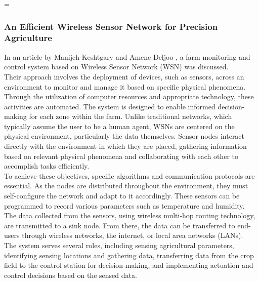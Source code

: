 =\documentclass[12pt, a4paper]{article}
\begin{document}
\subsubsection{An Efficient Wireless Sensor Network for Precision Agriculture}
In an article by Manijeh Keshtgary and Amene Deljoo \cite{keshtgary2012efficient}, a farm monitoring and control system based on Wireless Sensor Network (WSN) was discussed.\\
Their approach involves the deployment of devices, such as sensors, across an environment to monitor and manage it based on specific physical phenomena. Through the utilization of computer resources and appropriate technology, these activities are automated. The system is designed to enable informed decision-making for each zone within the farm. Unlike traditional networks, which typically assume the user to be a human agent, WSNs are centered on the physical environment, particularly the data themselves. Sensor nodes interact directly with the environment in which they are placed, gathering information based on relevant physical phenomena and collaborating with each other to accomplish tasks efficiently.\\
To achieve these objectives, specific algorithms and communication protocols are essential. As the nodes are distributed throughout the environment, they must self-configure the network and adapt to it accordingly. These sensors can be programmed to record various parameters such as temperature and humidity. The data collected from the sensors, using wireless multi-hop routing technology, are transmitted to a sink node. From there, the data can be transferred to end-users through wireless networks, the internet, or local area networks (LANs).\\
The system serves several roles, including sensing agricultural parameters, identifying sensing locations and gathering data, transferring data from the crop field to the control station for decision-making, and implementing actuation and control decisions based on the sensed data.
\end{document}
